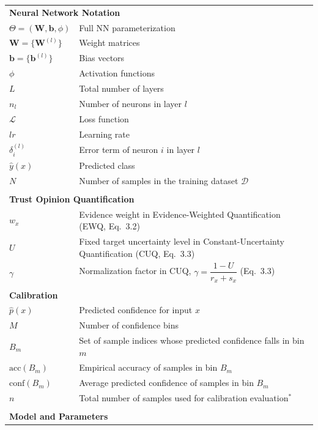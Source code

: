 \begin{longtable}{lp{9cm}}
\hline
\\
\hline
\multicolumn{2}{l}{\textbf{Neural Network Notation}} \\
$\Theta = (\mathbf{W}, \mathbf{b}, \phi)$ & Full \acs{NN} parameterization \\
$\mathbf{W} = \{\mathbf{W}^{(l)}\}$ & Weight matrices \\
$\mathbf{b} = \{\mathbf{b}^{(l)}\}$ & Bias vectors \\
$\phi$ & Activation functions \\
$L$ & Total number of layers \\
$n_l$ & Number of neurons in layer $l$ \\
$\mathcal{L}$ & Loss function \\
$lr$ & Learning rate \\
$\delta_i^{(l)}$ & Error term of neuron $i$ in layer $l$ \\
$\hat{y}(x)$ & Predicted class \\
$N$ & Number of samples in the training dataset $\mathcal{D}$ \\[4pt]
\hline
\\
\hline
\multicolumn{2}{l}{\textbf{Trust Opinion Quantification}} \\
$w_x$ & Evidence weight in Evidence-Weighted Quantification (EWQ, Eq.~3.2) \\
$U$ & Fixed target uncertainty level in Constant-Uncertainty Quantification (CUQ, Eq.~3.3) \\
$\gamma$ & Normalization factor in CUQ, $\gamma = \dfrac{1-U}{r_x+s_x}$ (Eq.~3.3) \\[4pt]
\hline
\\
\hline
\multicolumn{2}{l}{\textbf{Calibration}} \\
$\hat{p}(x)$ & Predicted confidence for input $x$ \\
$M$ & Number of confidence bins \\
$B_m$ & Set of sample indices whose predicted confidence falls in bin $m$ \\
$\mathrm{acc}(B_m)$ & Empirical accuracy of samples in bin $B_m$ \\
$\mathrm{conf}(B_m)$ & Average predicted confidence of samples in bin $B_m$ \\
$n$ & Total number of samples used for calibration evaluation$^{*}$ \\[4pt]
\hline
\\
\hline
\multicolumn{2}{l}{\textbf{Model and Parameters}} \\


\end{longtable}
